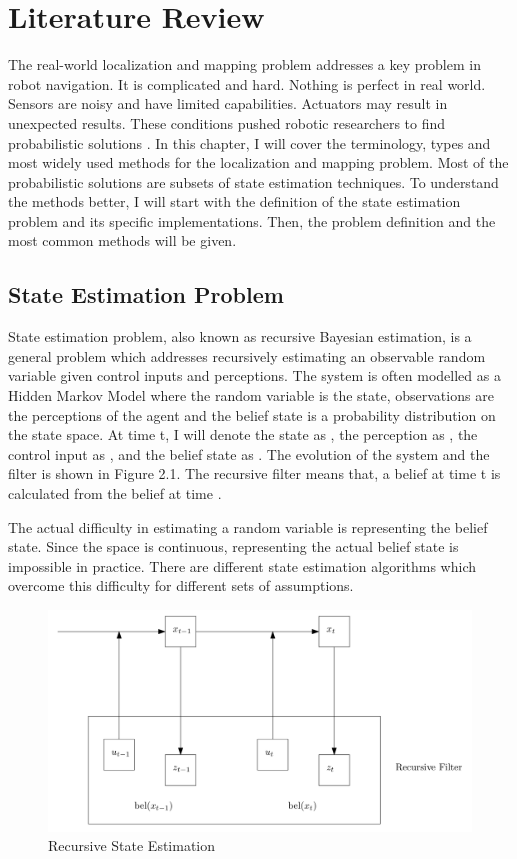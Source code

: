 \chapter{Literature Review}
The real-world localization and mapping problem addresses a key problem in robot navigation. It is complicated and hard. Nothing is perfect in real world. Sensors are noisy and have limited capabilities. Actuators may result in unexpected results. These conditions pushed robotic researchers to find probabilistic solutions \cite{thrun2005}. In this chapter, I will cover the terminology, types and most widely used methods for the localization and mapping problem. Most of the probabilistic solutions are subsets of state estimation techniques. To understand the methods better, I will start with the definition of the state estimation problem and its specific implementations. Then, the problem definition and the most common methods will be given.

\section{State Estimation Problem}
State estimation problem, also known as recursive Bayesian estimation, is a general problem which addresses recursively estimating an observable random variable given control inputs and perceptions. The system is often modelled as a Hidden Markov Model where the random variable is the state, observations are the perceptions of the agent and the belief state is a probability distribution on the state space. At time t, I will denote the state as , the perception as , the control input as , and the belief state as . The evolution of the system and the filter is shown in Figure 2.1. The recursive filter means that, a belief at time t is calculated from the belief at time .

The actual difficulty in estimating a random variable is representing the belief state. Since the space is continuous, representing the actual belief state is impossible in practice. There are different state estimation algorithms which overcome this difficulty for different sets of assumptions.


\begin{figure}[!htbp]
\centering
\includegraphics[width=\textwidth]{thesisChapters/images/figure21.png}
\caption{Recursive State Estimation}
\end{figure}




